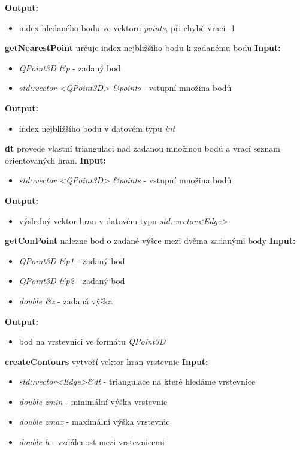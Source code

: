 \documentclass{article}
\begin{document}
 \textbf{Output:}
\begin{itemize} 
\item index hledaného bodu ve vektoru \textit{points}, při chybě vrací -1
\end{itemize}
\bigskip
\textbf{getNearestPoint} určuje index nejbližšího bodu k zadanému bodu
\textbf{Input:}
\begin{itemize} 
\item \textit{QPoint3D \&p} - zadaný bod
\item \textit{std::vector <QPoint3D> \&points} - vstupní množina bodů
\end{itemize}
 \textbf{Output:}
\begin{itemize} 
\item index nejbližšího bodu v datovém typu \textit{int}
\end{itemize}
\bigskip
\textbf{dt} provede vlastní triangulaci nad zadanou množinou bodů a vrací seznam orientovaných hran.
 \textbf{Input:}
\begin{itemize} 
\item \textit{std::vector <QPoint3D> \&points} - vstupní množina bodů
\end{itemize}
 \textbf{Output:}
\begin{itemize} 
\item výsledný vektor hran v datovém typu \textit{std::vector<Edge>}
\end{itemize}
\bigskip
\textbf{getConPoint} nalezne bod o zadané výšce mezi dvěma zadanými body
 \textbf{Input:}
\begin{itemize} 
\item \textit{QPoint3D \&p1} - zadaný bod
\item \textit{QPoint3D \&p2} - zadaný bod
\item \textit{double \&z} - zadaná výška
\end{itemize}
 \textbf{Output:}
\begin{itemize} 
\item bod na vrstevnici ve formátu \textit{QPoint3D}
\end{itemize}
\bigskip
\textbf{createContours} vytvoří vektor hran vrstevnic
 \textbf{Input:}
\begin{itemize} 
\item \textit{std::vector<Edge>\&dt} - triangulace na které hledáme vrstevnice
\item \textit{double zmin} - minimální výška vrstevnic
\item \textit{double zmax} - maximální výška vrstevnic
\item \textit{double h} - vzdálenost mezi vrstevnicemi
\end{itemize}
\end{document}
